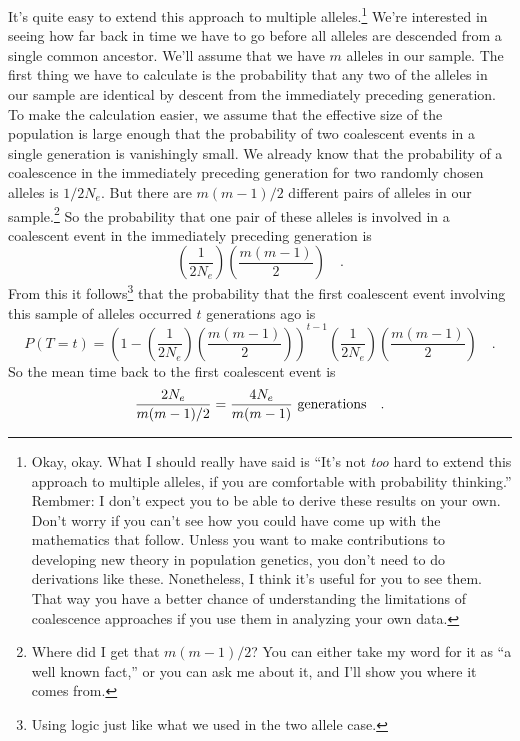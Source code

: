 \documentclass[12pt]{article}
\begin{document}
It's quite easy to extend this approach to multiple
alleles.\footnote{Okay, okay. What I should really have said is ``It's
  not {\it too\/} hard to extend this approach to multiple alleles, if
  you are comfortable with probability thinking.'' Rembmer: I don't
  expect you to be able to derive these results on your own. Don't
  worry if you can't see how you could have come up with the
  mathematics that follow. Unless you want to make contributions to
  developing new theory in population genetics, you don't need to do
  derivations like these. Nonetheless, I think it's useful for you to
  see them. That way you have a better chance of understanding the
  limitations of coalescence approaches if you use them in analyzing
  your own data.}  We're interested in seeing how far back in time we
have to go before all alleles are descended from a single common
ancestor. We'll assume that we have $m$ alleles in our sample. The
first thing we have to calculate is the probability that any two of
the alleles in our sample are identical by descent from the
immediately preceding generation. To make the calculation easier, we
assume that the effective size of the population is large enough that
the probability of two coalescent events in a single generation is
vanishingly small. We already know that the probability of a
coalescence in the immediately preceding generation for two randomly
chosen alleles is $1/2N_e$. But there are $m(m-1)/2$ different pairs
of alleles in our sample.\footnote{Where did I get that $m(m-1)/2$?
  You can either take my word for it as ``a well known fact,'' or you
  can ask me about it, and I'll show you where it comes from.} So the
probability that one pair of these alleles is involved in a coalescent
event in the immediately preceding generation is
\begin{equation}
  \left(\frac{1}{2N_e}\right)\left(\frac{m(m-1)}{2}\right) \quad .
  \label{eq:multi-allele-first-event}
\end{equation}
From this it follows\footnote{Using logic just like what we used in
the two allele case.} that the probability that the first coalescent
event involving this sample of alleles occurred $t$ generations ago is
\begin{equation}
P(T=t) =
\left(1-\left(\frac{1}{2N_e}\right)\left(\frac{m(m-1)}{2}\right)\right)^{t-1}
\left(\frac{1}{2N_e}\right)\left(\frac{m(m-1)}{2}\right)
\quad .
\label{eq:multi-allele}
\end{equation}
So the mean time back to the first coalescent event is
\[
\frac{2N_e}{m(m-1)/2} = \frac{4N_e}{m(m-1)} \hbox{ generations} \quad .
\]
\end{document}
